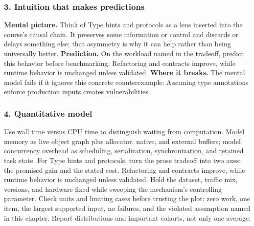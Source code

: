 \subsubsection*{3. Intuition that makes predictions}
\textbf{Mental picture.} Think of Type hints and protocols as a lens inserted into the course's causal chain. It preserves some information or control and discards or delays something else; that asymmetry is why it can help rather than being universally better.
\textbf{Prediction.} On the workload named in the tradeoff, predict this behavior before benchmarking: Refactoring and contracts improve, while runtime behavior is unchanged unless validated.
\textbf{Where it breaks.} The mental model fails if it ignores this concrete counterexample: Assuming type annotations enforce production inputs creates vulnerabilities.
\subsubsection*{4. Quantitative model}
Use wall time versus CPU time to distinguish waiting from computation. Model memory as live object graph plus allocator, native, and external buffers; model concurrency overhead as scheduling, serialization, synchronization, and retained task state.
For Type hints and protocols, turn the prose tradeoff into two axes: the promised gain and the stated cost. Refactoring and contracts improve, while runtime behavior is unchanged unless validated. Hold the dataset, traffic mix, versions, and hardware fixed while sweeping the mechanism's controlling parameter.
Check units and limiting cases before trusting the plot: zero work, one item, the largest supported input, no failures, and the violated assumption named in this chapter. Report distributions and important cohorts, not only one average.
